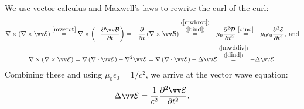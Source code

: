 We use vector calculus and Maxwell's laws to rewrite the curl of the curl:
\begin{gather*}
  \nabla\times\left(\nabla\times\ev\right)\overeq{mwerot}
  \nabla\times\left(-\frac{\partial \bv}{\partial t}\right)=
  -\frac{\partial}{\partial t}\left(\nabla\times\bv\right)
  \overset{\substack{(\ref{mwhrot})\\(\ref{bind})}}{=}
  -\mu_0\frac{\partial^2\mathcal{D}}{\partial t^2}\overeq{dind}
  -\mu_0\epsilon_0\frac{\partial^2\mathcal{E}}{\partial t^2},\;\text{and}\\
  \nabla\times\left(\nabla\times\ev\right)=
  \nabla\left(\nabla\cdot\ev\right)-\nabla^2\ev=
  \nabla\left(\nabla\cdot\ev\right)-\Delta\ev
  \overset{\substack{(\ref{mwddiv})\\(\ref{dind})}}{=}
  -\Delta\ev.
\end{gather*}
Combining these and using $\mu_0\epsilon_0=1/c^2$, we arrive at the vector wave equation:
\setcounter{equation}{2}
\begin{equation}
\label{scwe}
  \Delta\ev=\frac{1}{c^2}\frac{\partial^2\ev}{\partial t^2}.
\end{equation}

